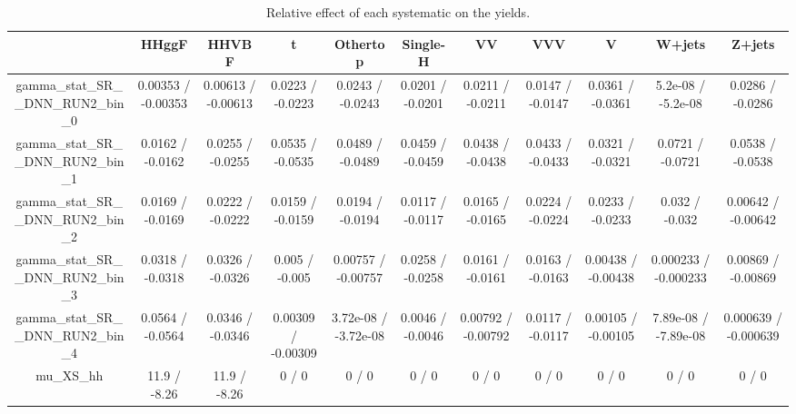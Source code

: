 \documentclass[10pt]{article}
\begin{document}
\begin{table}[htbp]
\begin{center}
\begin{tabular}{|c|c|c|c|c|c|c|c|c|c|c|}
\hline 
      & HHggF      & HHVBF      & t      & Othertop      & Single-H      & VV      & VVV      & V      & W+jets      & Z+jets \\ 
\hline 
  gamma_stat_SR__DNN_RUN2_bin_0 & 0.00353 / -0.00353 & 0.00613 / -0.00613 & 0.0223 / -0.0223 & 0.0243 / -0.0243 & 0.0201 / -0.0201 & 0.0211 / -0.0211 & 0.0147 / -0.0147 & 0.0361 / -0.0361 & 5.2e-08 / -5.2e-08 & 0.0286 / -0.0286 \\ 
  gamma_stat_SR__DNN_RUN2_bin_1 & 0.0162 / -0.0162 & 0.0255 / -0.0255 & 0.0535 / -0.0535 & 0.0489 / -0.0489 & 0.0459 / -0.0459 & 0.0438 / -0.0438 & 0.0433 / -0.0433 & 0.0321 / -0.0321 & 0.0721 / -0.0721 & 0.0538 / -0.0538 \\ 
  gamma_stat_SR__DNN_RUN2_bin_2 & 0.0169 / -0.0169 & 0.0222 / -0.0222 & 0.0159 / -0.0159 & 0.0194 / -0.0194 & 0.0117 / -0.0117 & 0.0165 / -0.0165 & 0.0224 / -0.0224 & 0.0233 / -0.0233 & 0.032 / -0.032 & 0.00642 / -0.00642 \\ 
  gamma_stat_SR__DNN_RUN2_bin_3 & 0.0318 / -0.0318 & 0.0326 / -0.0326 & 0.005 / -0.005 & 0.00757 / -0.00757 & 0.0258 / -0.0258 & 0.0161 / -0.0161 & 0.0163 / -0.0163 & 0.00438 / -0.00438 & 0.000233 / -0.000233 & 0.00869 / -0.00869 \\ 
  gamma_stat_SR__DNN_RUN2_bin_4 & 0.0564 / -0.0564 & 0.0346 / -0.0346 & 0.00309 / -0.00309 & 3.72e-08 / -3.72e-08 & 0.0046 / -0.0046 & 0.00792 / -0.00792 & 0.0117 / -0.0117 & 0.00105 / -0.00105 & 7.89e-08 / -7.89e-08 & 0.000639 / -0.000639 \\ 
  mu_XS_hh & 11.9 / -8.26 & 11.9 / -8.26 & 0 / 0 & 0 / 0 & 0 / 0 & 0 / 0 & 0 / 0 & 0 / 0 & 0 / 0 & 0 / 0 \\ 
\hline 
\end{tabular} 
\caption{Relative effect of each systematic on the yields.} 
\end{center} 
\end{table} 
\end{document}
